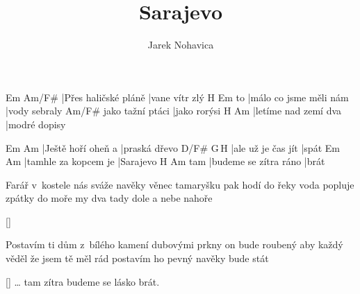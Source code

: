 \documentclass{song}
\title{Sarajevo}
\author{Jarek Nohavica}
\begin{document}
\strophe
Em                   Am/F\#
|Přes haličské pláně |vane vítr zlý
   H\7                    Em
to |málo co jsme měli nám |vody sebraly
                 Am/F\#
jako tažní ptáci |jako rorýsi
H\7                  Am
|letíme nad zemí dva |modré dopisy
\endstrophe

Em                 Am
|Ještě hoří oheň a |praská dřevo
D\7/F\#            G\,H\7
|ale už je čas jít |spát
Em                   Am
|tamhle za kopcem je |Sarajevo
    H\7                   Am
tam |budeme se zítra ráno |brát
\endstrophe

\strophe*
Farář v~kostele nás sváže navěky
věnec tamaryšku pak hodí do řeky
voda popluje zpátky do moře
my dva tady dole a nebe nahoře
\endstrophe

\ref{}

\strophe*
Postavím ti dům z~bílého kamení
dubovými prkny on bude roubený
aby každý věděl že jsem tě měl rád
postavím ho pevný navěky bude stát
\endstrophe

\ref{} \ldots{} tam zítra budeme se lásko brát.
\end{document}
